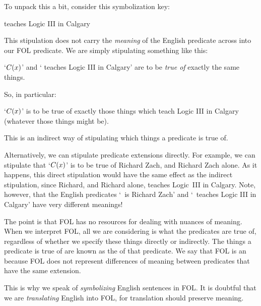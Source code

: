 To unpack this a bit, consider this symbolization key: 
	\begin{ekey}
		\item[\atom{C}{x}]  teaches Logic III in Calgary
	\end{ekey} 
This stipulation does not carry the \emph{meaning} of the English predicate across into our FOL predicate. We are simply stipulating something like this:
	\begin{ebullet}
		\item `$\mathord{C}(x)$' and ` teaches Logic III in Calgary' are to be \emph{true of} exactly the same things.
	\end{ebullet}
So, in particular:
	\begin{ebullet}
		\item `$\mathord{C}(x)$' is to be true of exactly those things which teach Logic III in Calgary (whatever those things might be).
	\end{ebullet}
This is an indirect way of stipulating which things a predicate is true of.

Alternatively, we can stipulate predicate extensions directly. For example, we can stipulate that `$\mathord{C}(x)$' is to be true of Richard Zach, and Richard Zach alone. As it happens, this direct stipulation would have the same effect as the indirect stipulation, since Richard, and Richard alone, teaches Logic~III in Calgary. Note, however, that the English predicates `\blank\ is Richard Zach' and `\blank\ teaches Logic III in Calgary' have very different meanings!

The point is that FOL has no resources for dealing with nuances of meaning. When we interpret FOL, all we are considering is what the predicates are true of, regardless of whether we specify these things directly or indirectly. The things a predicate is true of are known as the  of that predicate. We say that FOL is an  because FOL does not represent differences of meaning between predicates that have the same extension.    

This is why we speak of \emph{symbolizing} English sentences in FOL. It is doubtful that we are \emph{translating} English into FOL, for translation should preserve meaning.

